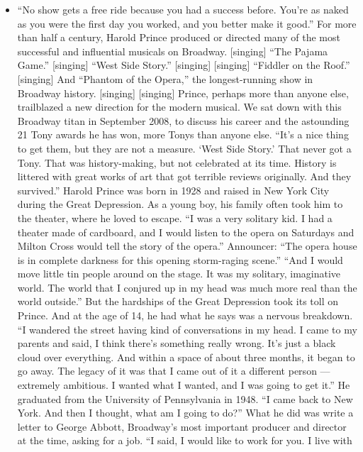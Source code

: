 \begin{itemize}
\tightlist
\item
  ``No show gets a free ride because you had a success before. You're as
  naked as you were the first day you worked, and you better make it
  good.'' For more than half a century, Harold Prince produced or
  directed many of the most successful and influential musicals on
  Broadway. {[}singing{]} ``The Pajama Game.'' {[}singing{]} ``West Side
  Story.'' {[}singing{]} {[}singing{]} ``Fiddler on the Roof.''
  {[}singing{]} And ``Phantom of the Opera,'' the longest-running show
  in Broadway history. {[}singing{]} {[}singing{]} Prince, perhaps more
  than anyone else, trailblazed a new direction for the modern musical.
  We sat down with this Broadway titan in September 2008, to discuss his
  career and the astounding 21 Tony awards he has won, more Tonys than
  anyone else. ``It's a nice thing to get them, but they are not a
  measure. `West Side Story.' That never got a Tony. That was
  history-making, but not celebrated at its time. History is littered
  with great works of art that got terrible reviews originally. And they
  survived.'' Harold Prince was born in 1928 and raised in New York City
  during the Great Depression. As a young boy, his family often took him
  to the theater, where he loved to escape. ``I was a very solitary kid.
  I had a theater made of cardboard, and I would listen to the opera on
  Saturdays and Milton Cross would tell the story of the opera.''
  Announcer: ``The opera house is in complete darkness for this opening
  storm-raging scene.'' ``And I would move little tin people around on
  the stage. It was my solitary, imaginative world. The world that I
  conjured up in my head was much more real than the world outside.''
  But the hardships of the Great Depression took its toll on Prince. And
  at the age of 14, he had what he says was a nervous breakdown. ``I
  wandered the street having kind of conversations in my head. I came to
  my parents and said, I think there's something really wrong. It's just
  a black cloud over everything. And within a space of about three
  months, it began to go away. The legacy of it was that I came out of
  it a different person --- extremely ambitious. I wanted what I wanted,
  and I was going to get it.'' He graduated from the University of
  Pennsylvania in 1948. ``I came back to New York. And then I thought,
  what am I going to do?'' What he did was write a letter to George
  Abbott, Broadway's most important producer and director at the time,
  asking for a job. ``I said, I would like to work for you. I live with

\end{itemize}
